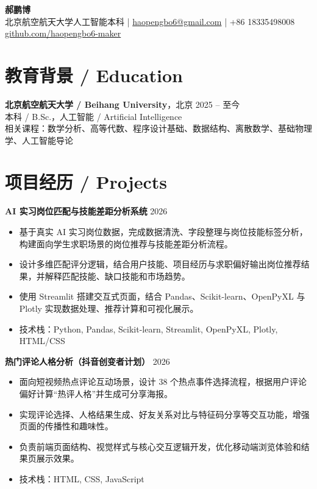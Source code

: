 \documentclass[10pt,a4paper]{article}
\begin{document}
\begin{center}
    {\LARGE \textbf{郝鹏博}}\\
    \vspace{1.5mm}
    北京航空航天大学人工智能本科 \quad | \quad
    \href{mailto:haopengbo6@gmail.com}{haopengbo6@gmail.com} \quad | \quad
    +86 18335498008\\
    \href{https://github.com/haopengbo6-maker}{github.com/haopengbo6-maker}
\end{center}

\section*{教育背景 / Education}
\textbf{北京航空航天大学 / Beihang University}，北京 \hfill 2025 -- 至今\\
本科 / B.Sc.，人工智能 / Artificial Intelligence\\
相关课程：数学分析、高等代数、程序设计基础、数据结构、离散数学、基础物理学、人工智能导论

\section*{项目经历 / Projects}

\textbf{AI 实习岗位匹配与技能差距分析系统} \hfill 2026
\begin{itemize}
    \item 基于真实 AI 实习岗位数据，完成数据清洗、字段整理与岗位技能标签分析，构建面向学生求职场景的岗位推荐与技能差距分析流程。
    \item 设计多维匹配评分逻辑，结合用户技能、项目经历与求职偏好输出岗位推荐结果，并解释匹配技能、缺口技能和市场趋势。
    \item 使用 Streamlit 搭建交互式页面，结合 Pandas、Scikit-learn、OpenPyXL 与 Plotly 实现数据处理、推荐计算和可视化展示。
    \item 技术栈：Python, Pandas, Scikit-learn, Streamlit, OpenPyXL, Plotly, HTML/CSS
\end{itemize}

\textbf{热门评论人格分析（抖音创变者计划）} \hfill 2026
\begin{itemize}
    \item 面向短视频热点评论互动场景，设计 38 个热点事件选择流程，根据用户评论偏好计算“热评人格”并生成可分享海报。
    \item 实现评论选择、人格结果生成、好友关系对比与特征码分享等交互功能，增强页面的传播性和趣味性。
    \item 负责前端页面结构、视觉样式与核心交互逻辑开发，优化移动端浏览体验和结果页展示效果。
    \item 技术栈：HTML, CSS, JavaScript
\end{itemize}
\end{document}
